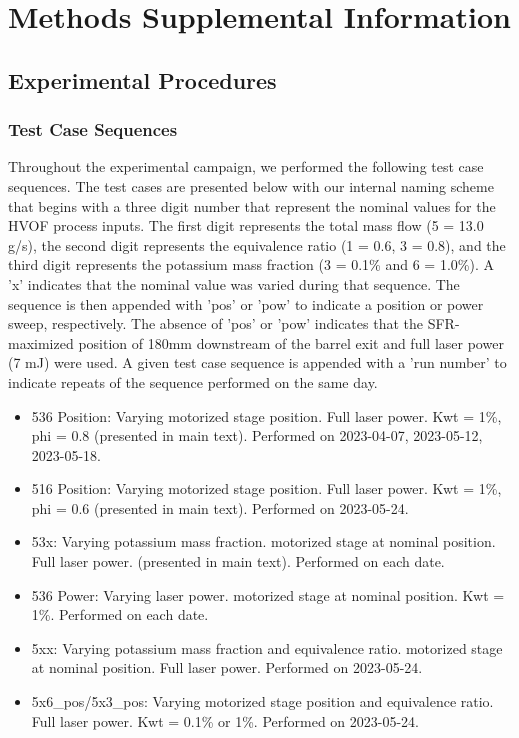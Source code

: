 \section{Methods Supplemental Information}


\subsection{Experimental Procedures}

\subsubsection{Test Case Sequences}


Throughout the experimental campaign, we performed the following test case sequences. The test cases are presented below with our internal naming scheme that begins with a three digit number that represent the nominal values for the HVOF process inputs. The first digit represents the total mass flow (5 = 13.0 g/s), the second digit represents the equivalence ratio (1 = 0.6, 3 = 0.8), and the third digit represents the potassium mass fraction (3 = 0.1\% and 6 = 1.0\%). A 'x' indicates that the nominal value was varied during that sequence. The sequence is then appended with 'pos' or 'pow' to indicate a position or power sweep, respectively. The absence of 'pos' or 'pow' indicates that the SFR-maximized position of 180mm downstream of the barrel exit and full laser power (7 mJ) were used. A given test case sequence is appended with a 'run number' to indicate repeats of the sequence performed on the same day. 


\begin{itemize}
    \item 536 Position: Varying motorized stage position. Full laser power. Kwt = 1\%, phi = 0.8 (presented in main text). Performed on 2023-04-07, 2023-05-12, 2023-05-18.
    \item 516 Position: Varying motorized stage position. Full laser power. Kwt = 1\%, phi = 0.6 (presented in main text). Performed on 2023-05-24.
    \item 53x: Varying potassium mass fraction. motorized stage at nominal position. Full laser power. (presented in main text). Performed on each date. 
    \item 536 Power: Varying laser power. motorized stage at nominal position. Kwt = 1\%. Performed on each date. 
    \item 5xx: Varying potassium mass fraction and equivalence ratio. motorized stage at nominal position. Full laser power. Performed on 2023-05-24.
    \item 5x6\_pos/5x3\_pos: Varying motorized stage position and equivalence ratio. Full laser power. Kwt = 0.1\% or 1\%. Performed on 2023-05-24.
\end{itemize}

